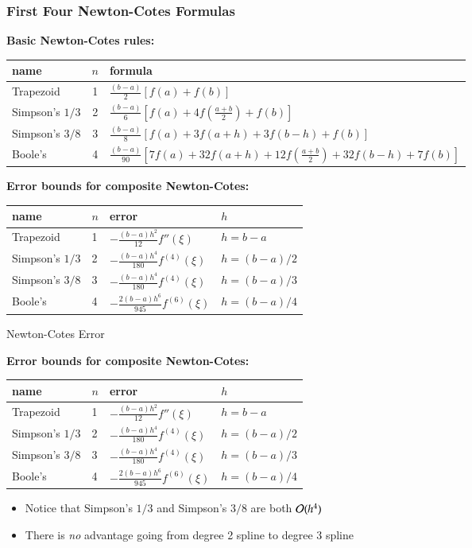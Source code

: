 \documentclass[10pt]{beamer}
\begin{document}
\begin{frame}
\frametitle{First Four Newton-Cotes Formulas}

   \textbf{Basic Newton-Cotes rules:}
   \begin{tabular}{l c l}
   name & $n$ & formula \\\hline
   Trapezoid       & 1 & $\frac{(b-a)}{2}\left[f(a) + f(b)\right]$\\[5pt]
   Simpson's $1/3$ & 2 & $\frac{(b-a)}{6}\left[f(a) + 4f(\frac{a+b}{2}) + f(b)\right]$\\[5pt]
   Simpson's $3/8$ & 3 & $\frac{(b-a)}{8}\left[f(a) + 3f(a+h) + 3f(b-h) + f(b)\right]$\\[5pt]
   Boole's         & 4 & $\frac{(b-a)}{90}\left[7f(a) + 32f(a+h) + 12f(\frac{a+b}{2}) + 32f(b-h)+7f(b)\right]$\\[5pt]
   \end{tabular}
   \smallskip

   \textbf{Error bounds for composite Newton-Cotes:}
   \begin{tabular}{l l l l}
   name & $n$ & error & $h$\\\hline
   Trapezoid       & 1 & $-\frac{(b-a)h^2}{12}f''(\xi)$ & $h=b-a$\\[5pt]
   Simpson's $1/3$ & 2 & $-\frac{(b-a)h^4}{180}f^{(4)}(\xi)$ & $h=(b-a)/2$\\[5pt]
   Simpson's $3/8$ & 3 & $-\frac{(b-a)h^4}{180}f^{(4)}(\xi)$ & $h=(b-a)/3$\\[5pt]
   Boole's         & 4 & $-\frac{2(b-a)h^6}{945}f^{(6)}(\xi)$ & $h=(b-a)/4$\\[5pt]
   \end{tabular}

\end{frame}
\begin{frame}{Newton-Cotes Error}

   \textbf{Error bounds for composite Newton-Cotes:}
   \begin{tabular}{l l l l}
   name & $n$ & error & $h$\\\hline
   Trapezoid       & 1 & $-\frac{(b-a)h^2}{12}f''(\xi)$ & $h=b-a$\\[5pt]
   Simpson's $1/3$ & 2 & $-\frac{(b-a)h^4}{180}f^{(4)}(\xi)$ & $h=(b-a)/2$\\[5pt]
   Simpson's $3/8$ & 3 & $-\frac{(b-a)h^4}{180}f^{(4)}(\xi)$ & $h=(b-a)/3$\\[5pt]
   Boole's         & 4 & $-\frac{2(b-a)h^6}{945}f^{(6)}(\xi)$ & $h=(b-a)/4$\\[5pt]
   \end{tabular}
   \vspace{5mm}
   \begin{itemize}
       \item Notice that Simpson's $1/3$ and Simpson's $3/8$ are both ${\mathcal{O}}(h^4)$
       \item There is \emph{no} advantage going from degree 2 spline to degree 3 spline
   \end{itemize}

\end{frame}
\end{document}
